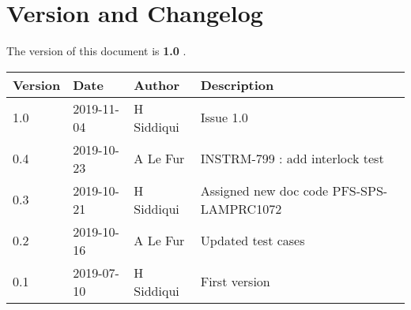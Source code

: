 \section{Version and Changelog}

The version of this document is {\bf 1.0} .

\begin{table}[H]
    \begin{tabular}{|l|l|l|p{10cm}| }
    \hline
    {\bf Version} & {\bf Date} & {\bf Author} & {\bf Description} \\ \hline
    1.0 & 2019-11-04 & H Siddiqui & Issue 1.0\\ \hline
    0.4 & 2019-10-23 & A Le Fur & INSTRM-799 : add interlock test\\ \hline
    0.3 & 2019-10-21 & H Siddiqui & Assigned new doc code PFS-SPS-LAMPRC1072 \\ \hline
    0.2 & 2019-10-16 & A Le Fur & Updated test cases \\ \hline
    0.1 & 2019-07-10 & H Siddiqui & First version \\ \hline
    \end{tabular}
\end{table}

